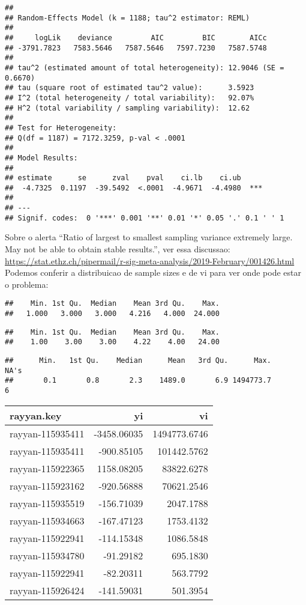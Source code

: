 \documentclass[
]{article}
\begin{document}
\begin{verbatim}
## 
## Random-Effects Model (k = 1188; tau^2 estimator: REML)
## 
##     logLik    deviance         AIC         BIC        AICc   
## -3791.7823   7583.5646   7587.5646   7597.7230   7587.5748   
## 
## tau^2 (estimated amount of total heterogeneity): 12.9046 (SE = 0.6670)
## tau (square root of estimated tau^2 value):      3.5923
## I^2 (total heterogeneity / total variability):   92.07%
## H^2 (total variability / sampling variability):  12.62
## 
## Test for Heterogeneity:
## Q(df = 1187) = 7172.3259, p-val < .0001
## 
## Model Results:
## 
## estimate      se      zval    pval    ci.lb    ci.ub      
##  -4.7325  0.1197  -39.5492  <.0001  -4.9671  -4.4980  *** 
## 
## ---
## Signif. codes:  0 '***' 0.001 '**' 0.01 '*' 0.05 '.' 0.1 ' ' 1
\end{verbatim}

Sobre o alerta ``Ratio of largest to smallest sampling variance
extremely large. May not be able to obtain stable results.'', ver essa
discussao:
\url{https://stat.ethz.ch/pipermail/r-sig-meta-analysis/2019-February/001426.html}
Podemos conferir a distribuicao de sample sizes e de vi para ver onde
pode estar o problema:

\begin{verbatim}
##    Min. 1st Qu.  Median    Mean 3rd Qu.    Max. 
##   1.000   3.000   3.000   4.216   4.000  24.000
\end{verbatim}

\begin{verbatim}
##    Min. 1st Qu.  Median    Mean 3rd Qu.    Max. 
##    1.00    3.00    3.00    4.22    4.00   24.00
\end{verbatim}

\begin{verbatim}
##      Min.   1st Qu.    Median      Mean   3rd Qu.      Max.      NA's 
##       0.1       0.8       2.3    1489.0       6.9 1494773.7         6
\end{verbatim}

\begin{longtable}[]{@{}lrr@{}}
\toprule()
rayyan.key & yi & vi \\
\midrule()
\endhead
rayyan-115935411 & -3458.06035 & 1494773.6746 \\
rayyan-115935411 & -900.85105 & 101442.5762 \\
rayyan-115922365 & 1158.08205 & 83822.6278 \\
rayyan-115923162 & -920.56888 & 70621.2546 \\
rayyan-115935519 & -156.71039 & 2047.1788 \\
rayyan-115934663 & -167.47123 & 1753.4132 \\
rayyan-115922941 & -114.15348 & 1086.5848 \\
rayyan-115934780 & -91.29182 & 695.1830 \\
rayyan-115922941 & -82.20311 & 563.7792 \\
rayyan-115926424 & -141.59031 & 501.3954 \\
\bottomrule()
\end{longtable}
\end{document}
